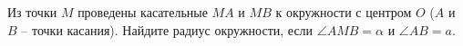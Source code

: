 \begin{ex}
	\begin{condition}
		Из точки \( M  \) проведены касательные \( MA  \) и \( MB  \) к окружности с центром \( O  \) (\( A  \) и \( B \) – точки касания). Найдите радиус окружности, если \( \angle AMB = \alpha  \) и \( \angle AB = a \).
	\end{condition}
\end{ex}